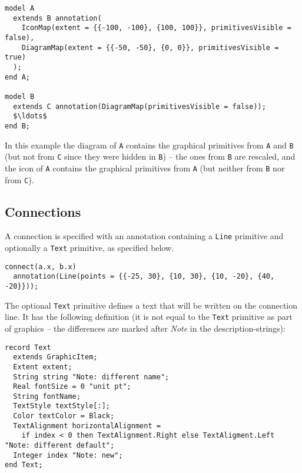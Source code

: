 \begin{example}
\begin{lstlisting}[language=modelica]
model A
  extends B annotation(
    IconMap(extent = {{-100, -100}, {100, 100}}, primitivesVisible = false),
    DiagramMap(extent = {{-50, -50}, {0, 0}}, primitivesVisible = true)
  );
end A;

model B
  extends C annotation(DiagramMap(primitivesVisible = false));
  $\ldots$
end B;
\end{lstlisting}
In this example the diagram of \lstinline!A! contains the graphical primitives from \lstinline!A! and \lstinline!B! (but not from \lstinline!C! since they were hidden in \lstinline!B!) -- the ones from \lstinline!B! are rescaled, and the icon of \lstinline!A! contains the graphical primitives from \lstinline!A! (but neither from \lstinline!B! nor from \lstinline!C!).
\end{example}

\subsection{Connections}\label{connections1}

A connection is specified with an annotation containing a \lstinline!Line! primitive and optionally a \lstinline!Text! primitive, as specified below.

\begin{example}
\begin{lstlisting}[language=modelica]
connect(a.x, b.x)
  annotation(Line(points = {{-25, 30}, {10, 30}, {10, -20}, {40, -20}}));
\end{lstlisting}
\end{example}

The optional \lstinline!Text! primitive defines a text that will be written on the connection line.
It has the following definition (it is not equal to the \lstinline!Text! primitive as part of graphics -- the differences are marked after \emph{Note} in the description-strings):
\begin{lstlisting}[language=modelica]
record Text
  extends GraphicItem;
  Extent extent;
  String string "Note: different name";
  Real fontSize = 0 "unit pt";
  String fontName;
  TextStyle textStyle[:];
  Color textColor = Black;
  TextAlignment horizontalAlignment =
    if index < 0 then TextAlignment.Right else TextAligment.Left "Note: different default";
  Integer index "Note: new";
end Text;
\end{lstlisting}

